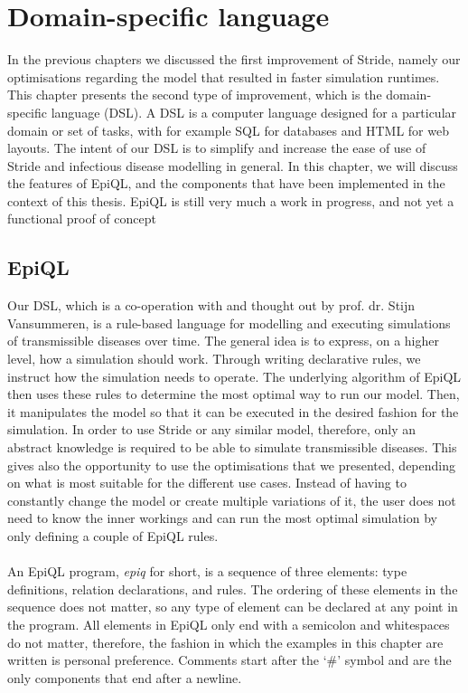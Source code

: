\chapter{Domain-specific language}
\label{chapter:dsl}
In the previous chapters we discussed the first improvement of Stride, namely our optimisations regarding the model that resulted in faster simulation runtimes. This chapter presents the second type of improvement, which is the domain-specific language (DSL). A DSL is a computer language designed for a particular domain or set of tasks, with for example SQL for databases and HTML for web layouts. The intent of our DSL is to simplify and increase the ease of use of Stride and infectious disease modelling in general. In this chapter, we will discuss the features of EpiQL, and the components that have been implemented in the context of this thesis. EpiQL is still very much a work in progress, and not yet a functional proof of concept

\section{EpiQL}
\label{sec:epiql}
Our DSL, which is a co-operation with and thought out by prof. dr. Stijn Vansummeren, is a rule-based language for modelling and executing simulations of transmissible diseases over time. The general idea is to express, on a higher level, how a simulation should work. Through writing declarative rules, we instruct how the simulation needs to operate. The underlying algorithm of EpiQL then uses these rules to determine the most optimal way to run our model. Then, it manipulates the model so that it can be executed in the desired fashion for the simulation. In order to use Stride or any similar model, therefore, only an abstract knowledge is required to be able to simulate transmissible diseases. This gives also the opportunity to use the optimisations that we presented, depending on what is most suitable for the different use cases. Instead of having to constantly change the model or create multiple variations of it, the user does not need to know the inner workings and can run the most optimal simulation by only defining a couple of EpiQL rules.
\\\\
An EpiQL program, \textit{epiq} for short, is a sequence of three elements: type definitions, relation declarations, and rules. The ordering of these elements in the sequence does not matter, so any type of element can be declared at any point in the program. All elements in EpiQL only end with a semicolon and whitespaces do not matter, therefore, the fashion in which the examples in this chapter are written is personal preference. Comments start after the `\#' symbol and are the only components that end after a newline.

